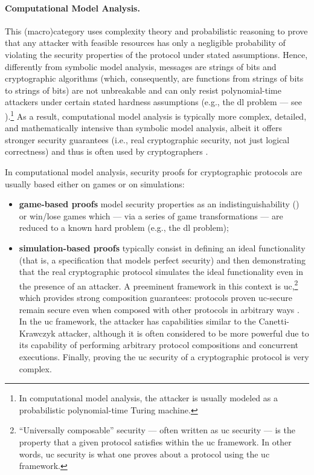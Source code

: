 \paragraph*{Computational Model Analysis.} This (macro)category uses complexity theory and probabilistic reasoning to prove that any attacker with feasible resources has only a negligible probability of violating the security properties of the protocol under stated assumptions. Hence, differently from symbolic model analysis, messages are strings of bits and cryptographic algorithms (which, consequently, are functions from strings of bits to strings of bits) are not unbreakable and can only resist polynomial-time attackers under certain stated hardness assumptions (e.g., the \gls{dl} problem --- see ).\footnote{In computational model analysis, the attacker is usually modeled as a probabilistic polynomial-time Turing machine.} As a result, computational model analysis is typically more complex, detailed, and mathematically intensive than symbolic model analysis, albeit it offers stronger security guarantees (i.e., real cryptographic security, not just logical correctness) and thus is often used by cryptographers \cite{hutchison_security_2012}.

In computational model analysis, security proofs for cryptographic protocols are usually based either on games or on simulations:
\begin{itemize}
	\item \textbf{game-based proofs} model security properties as an indistinguishability () or win/lose games which  --- via a series of game transformations --- are reduced to a known hard problem (e.g., the \gls{dl} problem);
	\item \textbf{simulation-based proofs} typically consist in defining an ideal functionality (that is, a specification that models perfect security) and then demonstrating that the real cryptographic protocol simulates the ideal functionality even in the presence of an attacker. A preeminent framework in this context is \gls{uc},\footnote{``Universally composable'' security --- often written as \gls{uc} security --- is the property that a given protocol satisfies within the \gls{uc} framework. In other words, \gls{uc} security is what one proves about a protocol using the \gls{uc} framework.} which provides strong composition guarantees: protocols proven \gls{uc}-secure remain secure even when composed with other protocols in arbitrary ways \cite{canetti_universally_2001}. In the \gls{uc} framework, the attacker has capabilities similar to the Canetti-Krawczyk attacker, although it is often considered to be more powerful due to its capability of performing arbitrary protocol compositions and concurrent executions. Finally, proving the \gls{uc} security of a cryptographic protocol is very complex.
\end{itemize}

